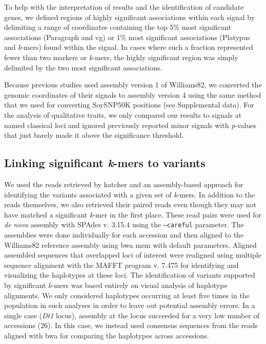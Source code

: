 To help with the interpretation of results and the identification of candidate
genes, we defined regions of highly significant associations within each signal
by delimiting a range of coordinates containing the top 5\% most significant
associations (Paragraph and vg) or 1\% most significant associations (Platypus
and \emph{k}-mers) found within the signal. In cases where such a fraction
represented fewer than two markers or \emph{k}-mers, the highly significant
region was simply delimited by the two most significant associations.

Because previous studies \citep{bandillo2015, bandillo2017} used assembly version 1 of
Williams82, we converted the genomic coordinates of their signals to assembly version 4
using the same method that we used for converting
SoySNP50K positions (see Supplemental data). For the analysis of
qualitative traits, we only compared our results to signals at named classical
loci and ignored previously reported minor signals with \emph{p}-values that
just barely made it above the significance threshold.

\subsection*{Linking significant \emph{k}-mers to variants}
\label{sv-gwas-methods-linking-kmers}

We used the reads retrieved by katcher and an assembly-based approach for
identifying the variants associated with a given set of \emph{k}-mers. In
addition to the reads themselves, we also retrieved their paired reads even
though they may not have matched a significant \emph{k}-mer in the first place.
These read pairs were used for \emph{de novo} assembly with SPAdes v. 3.15.4
\citep{spades} using the \texttt{--careful} parameter. The assemblies were done
individually for each accession and then aligned to the Williams82 reference
assembly using bwa mem with default parameters.  Aligned assembled sequences
that overlapped loci of interest were realigned using multiple sequence
alignment with the MAFFT program v. 7.475 \citep{katoh2002} for identifying and
visualizing the haplotypes at these loci. The identification of variants
supported by significant \textit{k}-mers was based entirely on visual analysis
of haplotype alignments. We only considered haplotypes occurring at least five
times in the population in such analyses in order to leave out potential
assembly errors. In a single case (\emph{Dt1} locus), assembly at the locus
succeeded for a very low number of accessions (26). In this case, we instead used
consensus sequences from the reads aligned with bwa for comparing the
haplotypes across accessions. 

